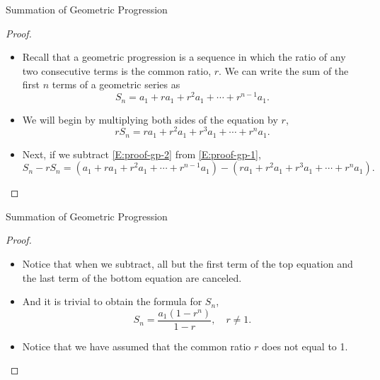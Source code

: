\begin{frame}[<+->]{Summation of Geometric Progression}
    \begin{proof}
        \begin{itemize}
            \item Recall that a geometric progression is a sequence in which the ratio of any two consecutive terms is the common ratio, $r$. We can write the sum of the first $n$ terms of a geometric series as
                \begin{equation}\label{E:proof-gp-1}
                    S_n = a_1 + ra_1 + r^2a_1 + \cdots + r^{n-1}a_1.
                \end{equation}
            \item We will begin by multiplying both sides of the equation by $r$,
                \begin{equation}\label{E:proof-gp-2}
                    rS_n = ra_1 + r^2a_1 + r^3a_1 + \cdots + r^na_1.
                \end{equation}
            \item Next, if we subtract \eqref{E:proof-gp-2} from \eqref{E:proof-gp-1},
                \[
                    S_n-rS_n = (a_1 + ra_1 + r^2a_1 + \cdots + r^{n-1}a_1) - (ra_1 + r^2a_1 + r^3a_1 + \cdots + r^na_1).
                \]
        \end{itemize}
        \vspace{-.7 cm}
    \end{proof}
\end{frame}

\begin{frame}[<+->]{Summation of Geometric Progression}
    \begin{proof}
        \begin{itemize}
            \item Notice that when we subtract, all but the first term of the top equation and the last term of the bottom equation are canceled.
            \item And it is trivial to obtain the formula for $S_n$,
                \begin{equation}\label{E:gp-formula}
                    S_n = \frac{a_1(1-r^n)}{1-r},\quad r\neq 1.
                \end{equation}
            \item Notice that we have assumed that the common ratio $r$ does not equal to 1.
        \end{itemize}
    \end{proof}
\end{frame}


